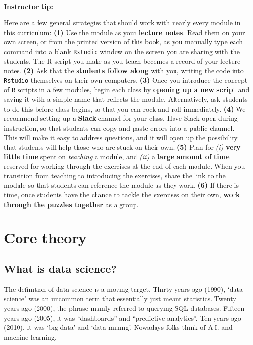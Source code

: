 \documentclass[]{book}
\begin{document}
~

\leavevmode\hypertarget{tip-text}{}%
\textbf{Instructor tip:}

Here are a few general strategies that should work with nearly every module in this curriculum: \textbf{(1)} Use the module as your \textbf{lecture notes}. Read them on your own screen, or from the printed version of this book, as you manually type each command into a blank \texttt{Rstudio} window on the screen you are sharing with the students. The R script you make as you teach becomes a record of your lecture notes. \textbf{(2)} Ask that the \textbf{students follow along} with you, writing the code into \texttt{Rstudio} themselves on their own computers. \textbf{(3)} Once you introduce the concept of \texttt{R} scripts in a few modules, begin each class by \textbf{opening up a new script} and saving it with a simple name that reflects the module. Alternatively, ask students to do this before class begins, so that you can rock and roll immediately. \textbf{(4)} We recommend setting up a \textbf{Slack} channel for your class. Have Slack open during instruction, so that students can copy and paste errors into a public channel. This will make it easy to address questions, and it will open up the possibility that students will help those who are stuck on their own. \textbf{(5)} Plan for \emph{(i)} \textbf{very little time} spent on \emph{teaching} a module, and \emph{(ii)} a \textbf{large amount of time} reserved for working through the exercises at the end of each module. When you transition from teaching to introducing the exercises, share the link to the module so that students can reference the module as they work. \textbf{(6)} If there is time, once students have the chance to tackle the exercises on their own, \textbf{work through the puzzles together} as a group.

\hypertarget{part-core-theory}{%
\part{Core theory}\label{part-core-theory}}

\hypertarget{what-is-data-science}{%
\chapter{What is data science?}\label{what-is-data-science}}

The definition of data science is a moving target. Thirty years ago (1990), `data science' was an uncommon term that essentially just meant statistics. Twenty years ago (2000), the phrase mainly referred to querying SQL databases. Fifteen years ago (2005), it was ``dashboards'' and ``predictive analytics''. Ten years ago (2010), it was `big data' and `data mining'. Nowadays folks think of A.I. and machine learning.
\end{document}
